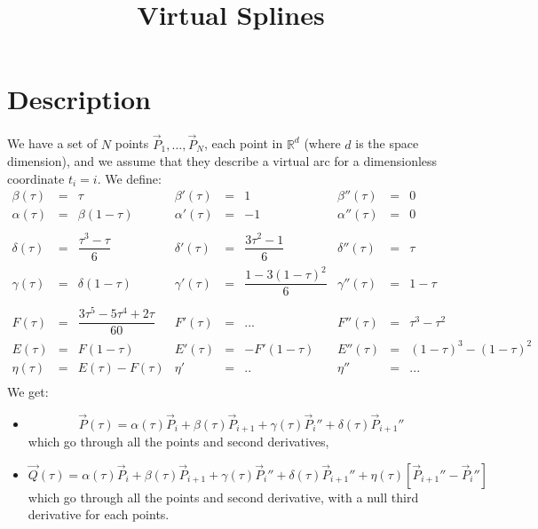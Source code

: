 \documentclass[aps,12pt]{revtex4}
\begin{document}
\title{Virtual Splines}
\maketitle
	

\section{Description}
We have a set of $N$ points $\vec{P}_1,\ldots,\vec{P}_N$, each point in $\mathbb{R}^d$ (where $d$ is the space dimension), and we assume
that they describe a virtual arc for a dimensionless coordinate $t_i=i$.
We define:
\begin{equation}
 	\begin{array}{rcl|rcl|rcl}
	\beta(\tau) & = & \tau  & \beta'(\tau) & = & 1 & \beta''(\tau) & = & 0\\
	\alpha(\tau) & = & \beta(1-\tau) & \alpha'(\tau) & = & -1 & \alpha''(\tau) & = & 0\\
	\\
	\delta(\tau) & = & \dfrac{\tau^3-\tau}{6} & \delta'(\tau) & = & \dfrac{3\tau^2-1}{6}& \delta''(\tau) & = & \tau\\
	\gamma(\tau) & = & \delta(1-\tau) & \gamma'(\tau) & = & \dfrac{1-3(1-\tau)^2}{6} & \gamma''(\tau) & = & 1-\tau\\
	\\
	F(\tau) & = & \dfrac{3\tau^5-5\tau^4+2\tau}{60} & F'(\tau) & = & ...& F''(\tau) & = & \tau^3-\tau^2\\
	E(\tau) & = & F(1-\tau) & E'(\tau) & = & -F'(1-\tau) & E''(\tau) & = & (1-\tau)^3-(1-\tau)^2\\
	\eta(\tau) & = & E(\tau)-F(\tau) & \eta' & = & .. & \eta'' & = & ...\\
	\end{array}
 \end{equation}
 We get:
\begin{itemize}
\item
\begin{equation}
\vec{P}(\tau) = \alpha(\tau)\vec{P}_i + \beta(\tau) \vec{P}_{i+1} + \gamma(\tau)\vec{P}_{i}'' + \delta(\tau) \vec{P}_{i+1}''
\end{equation}
which go through all the points and second derivatives,
\item
\begin{equation}
\vec{Q}(\tau) =  \alpha(\tau)\vec{P}_i + \beta(\tau) \vec{P}_{i+1} + \gamma(\tau)\vec{P}_{i}'' + \delta(\tau) \vec{P}_{i+1}'' + \eta(\tau) \left[ \vec{P}_{i+1}'' - \vec{P}_{i}''\right]
\end{equation}
which go through all the points and second derivative, with a null third derivative for each points.
\end{itemize}
\end{document}
